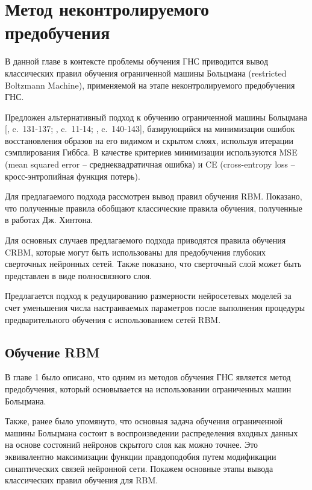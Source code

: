 \chapter{Метод неконтролируемого предобучения}

В данной главе в контексте проблемы обучения ГНС приводится вывод классических правил обучения ограниченной машины Больцмана (restricted Boltzmann Machine), применяемой на этапе неконтролируемого предобучения ГНС.

Предложен альтернативный подход к обучению ограниченной машины Больцмана [, c.~131-137; , c.~11-14; , c.~140-143], базирующийся на минимизации ошибок восстановления образов на его видимом и скрытом слоях, используя итерации сэмплирования Гиббса. В качестве критериев минимизации используются MSE (mean squared error -- среднеквадратичная ошибка) и CE (cross-entropy loss -- кросс-энтропийная функция потерь). 

Для предлагаемого подхода рассмотрен вывод правил обучения RBM. Показано, что полученные правила обобщают классические правила обучения, полученные в работах Дж. Хинтона.

Для основных случаев предлагаемого подхода приводятся правила обучения CRBM, которые могут быть использованы для предобучения глубоких сверточных нейронных сетей. Также показано, что сверточный слой может быть представлен в виде полносвязного слоя.

Предлагается подход к редуцированию размерности нейросетевых моделей за счет уменьшения числа настраиваемых параметров после выполнения процедуры предварительного обучения с использованием сетей RBM.

\section{Обучение RBM}
\label{sec:train_rbm_classic}

В главе 1 было описано, что одним из методов обучения ГНС является метод предобучения, который основывается на использовании ограниченных машин Больцмана.

Также, ранее было упомянуто, что основная задача обучения ограниченной машины Больцмана состоит в воспроизведении распределения входных данных на основе состояний нейронов скрытого слоя как можно точнее. Это эквивалентно  максимизации функции правдоподобия путем модификации синаптических связей нейронной сети. Покажем основные этапы вывода классических правил обучения для RBM.

